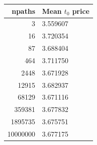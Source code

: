 \begin{tabular}{rl}
\toprule
npaths & Mean $t_0$ price \\
\midrule
3 & 3.559607 \\
16 & 3.720354 \\
87 & 3.688404 \\
464 & 3.711750 \\
2448 & 3.671928 \\
12915 & 3.682937 \\
68129 & 3.671116 \\
359381 & 3.677832 \\
1895735 & 3.675751 \\
10000000 & 3.677175 \\
\bottomrule
\end{tabular}
